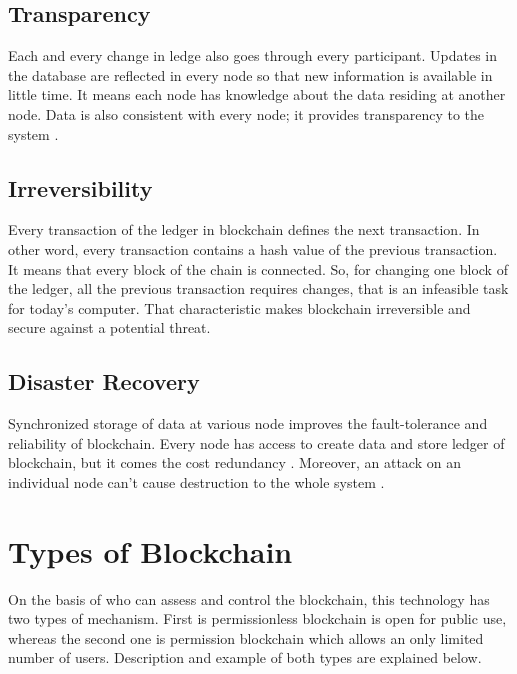 \documentclass[a4paper,twoside,12pt]{report}
\begin{document}
\begin{spacing}{1.5}
\subsection{Transparency}
Each and every change in ledge also goes through every participant. Updates in the database are reflected in every node so that new information is available in little time. It means each node has knowledge about the data residing at another node. Data is also consistent with every node; it provides transparency to the system \cite{satoshinakamoto}.  
\subsection{Irreversibility}
Every transaction of the ledger in blockchain defines the next transaction. In other word, every transaction contains a hash value of the previous transaction. It means that every block of the chain is connected. So, for changing one block of the ledger, all the previous transaction requires changes, that is an infeasible task for today's computer. That characteristic makes blockchain irreversible and secure against a potential threat.
\subsection{Disaster Recovery}
Synchronized storage of data at various node improves the fault-tolerance and reliability of blockchain. Every node has access to create data and store ledger of blockchain, but it comes the cost redundancy \cite{democraticmininginbitcoins,minerevolutioninbitcoinnetwork}.   
Moreover, an attack on an individual node can't cause destruction to the whole system \cite{fangfangdai}. 
\section{Types of Blockchain}
On the basis of who can assess and control the blockchain, this technology has two types of mechanism. First is permissionless blockchain is open for public use, whereas the second one is permission blockchain which allows an only limited number of users. Description and example of both types are explained below.       

\end{spacing}
\end{document}
